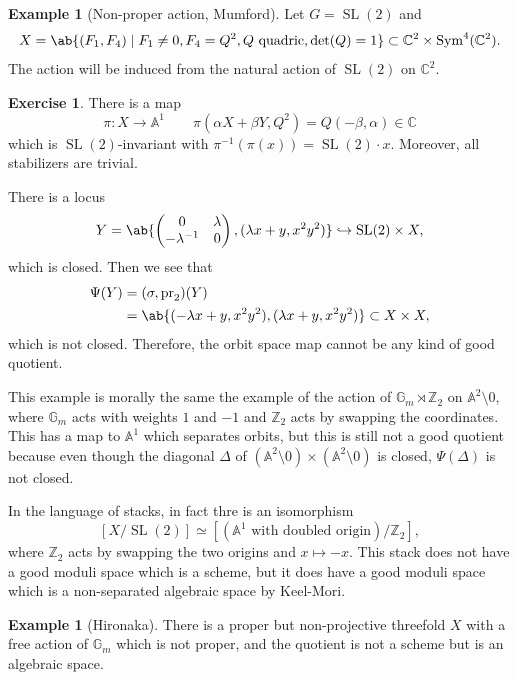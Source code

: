 \documentclass{amsart}
\theoremstyle{definition}
\newtheorem{exm}[thm]{Example}
\newtheorem{exer}[thm]{Exercise}
\theoremstyle{remark}
\theoremstyle{plain}
\theoremstyle{definition}
\theoremstyle{remark}
\newcommand{\A}{\mathbb{A}}
\newcommand{\G}{\mathbb{G}}
\newcommand{\C}{\mathbb{C}}
\newcommand{\Z}{\mathbb{Z}}
\newcommand{\on}[1]{\operatorname{#1}}
\newcommand{\1}{\mathbf{1}}
\newcommand{\2}{\mathbf{2}}
\newcommand{\3}{\mathbf{3}}
\begin{document}
\begin{exm}[Non-proper action, Mumford]\label{exm:non-proper-action}
    Let \(G = \on{SL}(2)\) and
    \[ X = \ab\{ (F_1, F_4) \mid F_1 \neq 0, F_4 = Q^2, Q \text{ quadric}, \det(Q) = 1 \} \subset \C^2 \times \on{Sym}^4(\C^2). \]
    The action will be induced from the natural action of \(\on{SL}(2)\) on \(\C^2\). 
    
    \begin{exer}
        There is a map
        \[ \pi \colon X \to \A^1 \qquad \pi(\alpha X + \beta Y, Q^2) = Q(-\beta, \alpha) \in \C \]
        which is \(\on{SL}(2)\)-invariant with \(\pi^{-1} (\pi(x)) = \on{SL}(2) \cdot x\). Moreover, all stabilizers are trivial.
    \end{exer}

    There is a locus 
    \[ Y = \ab\{ \begin{pmatrix}
        0 & \lambda \\
        -\lambda^{-1} & 0
    \end{pmatrix}, (\lambda x + y, x^2y^2) \} \hookrightarrow \on{SL}(2) \times X, \]
    which is closed. Then we see that
    \begin{align*}
        \Psi(Y) &= (\sigma, \on{pr}_2)(Y) \\
        &= \ab\{ (-\lambda x + y, x^2 y^2), (\lambda x + y, x^2 y^2) \} \subset X \times X,
    \end{align*}
    which is not closed. Therefore, the orbit space map cannot be any kind of good quotient.
\end{exm}

This example is morally the same the example of the action of \(\G_m \rtimes \Z_2\) on \(\A^2 \setminus 0\), where \(\G_m\) acts with weights \(1\) and \(-1\) and \(\Z_2\) acts by swapping the coordinates. This has a map to \(\A^1\) which separates orbits, but this is still not a good quotient because even though the diagonal \(\Delta\) of \((\A^2 \setminus 0) \times (\A^2 \setminus 0)\) is closed, \(\Psi (\Delta)\) is not closed.

In the language of stacks, in fact thre is an isomorphism
\[ [X/\on{SL}(2)] \simeq [(\A^1\text{ with doubled origin}) / \Z_2], \]
where \(\Z_2\) acts by swapping the two origins and \(x \mapsto -x\). This stack does not have a good moduli space which is a scheme, but it does have a good moduli space which is a non-separated algebraic space by Keel-Mori.

\begin{exm}[Hironaka]
    There is a proper but non-projective threefold \(X\) with a free action of \(\G_m\) which is not proper, and the quotient is not a scheme but is an algebraic space.
\end{exm}
\end{document}
